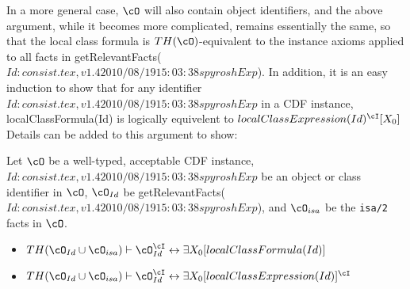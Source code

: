In a more general case, $\cO$ will also contain object identifiers,
and the above argument, while it becomes more complicated, remains
essentially the same, so that the local class formula is
$TH(\cO)$-equivalent to the instance axioms applied to all facts in
{\sf getRelevantFacts($Id: consist.tex,v 1.4 2010/08/19 15:03:38 spyrosh Exp $)}.  In addition, it is an easy induction to
show that for any identifier $Id: consist.tex,v 1.4 2010/08/19 15:03:38 spyrosh Exp $ in a CDF instance, {\sc
localClassFormula(Id)} is logically equivelent to
$localClassExpression(Id)^{\cI}[X_0]$
%
%
Details can be added to this argument to show: 

\begin{lemma} \label{lem:localce}
Let $\cO$ be a well-typed, acceptable CDF instance, $Id: consist.tex,v 1.4 2010/08/19 15:03:38 spyrosh Exp $ be an object
or class identifier in $\cO$, $\cO_{Id}$ be {\sf
getRelevantFacts($Id: consist.tex,v 1.4 2010/08/19 15:03:38 spyrosh Exp $)}, and $\cO_{isa}$ be the {\tt isa/2} facts
in $\cO$.
\begin{itemize}
\item $TH(\cO_{Id} \cup \cO_{isa}) \vdash \cO_{Id}^{\cI}
\leftrightarrow \exists X_0 [localClassFormula(Id)] $
\item 
$TH(\cO_{Id} \cup \cO_{isa}) \vdash \cO_{Id}^{\cI}
\leftrightarrow \exists X_0[localClassExpression(Id)]^{\cI}$
\end{itemize}
\end{lemma}

